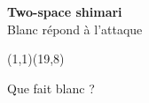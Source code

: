 \documentclass[preview, border=0pt, varwidth=false]{standalone}
\begin{document}
	\setgounit{0.5cm} 
	
	\parbox[c][14.65cm][c]{10.2cm}{
		\centering
		
		{\Large \textbf{Two-space shimari} \\ Blanc répond à l'attaque} 
		\vspace{3em}
		
		\begin{psgopartialboard}{(1,1)(19,8)}
			\pass
		\end{psgopartialboard}
		
		\vspace{1em}
		Que fait blanc ?
	}
	
\end{document}
